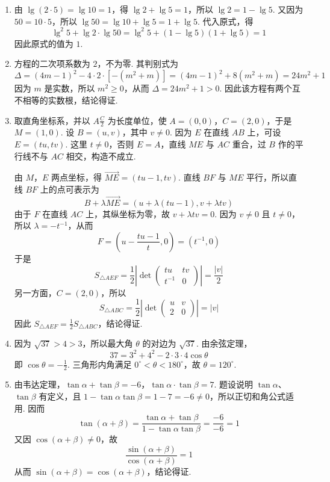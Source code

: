 \begin{solution}
\begin{enumerate}
\item 由 \(\lg\left(2\cdot5\right)=\lg10=1\)，得 \(\lg2+\lg5=1\)，所以 \(\lg2=1-\lg5\). 又因为 \(50=10\cdot5\)，所以 \(\lg50=\lg10+\lg5=1+\lg5\). 代入原式，得
\[
\lg^{2}5+\lg2\cdot\lg50=\lg^{2}5+\left(1-\lg5\right)\left(1+\lg5\right)=1
\]
因此原式的值为 \(1\).

\item 方程的二次项系数为 \(2\)，不为零. 其判别式为
\[
\Delta=\left(4m-1\right)^{2}-4\cdot2\cdot\left[-\left(m^{2}+m\right)\right]=\left(4m-1\right)^{2}+8\left(m^{2}+m\right)=24m^{2}+1
\]
因为 \(m\) 是实数，所以 \(m^{2}\geq0\)，从而 \(\Delta=24m^{2}+1>0\). 因此该方程有两个互不相等的实数根，结论得证.

\item 取直角坐标系，并以 \(A\frac{C}{2}\) 为长度单位，使 \(A=(0,0)\)，\(C=(2,0)\)，于是 \(M=(1,0)\). 设 \(B=(u,v)\)，其中 \(v\ne0\). 因为 \(E\) 在直线 \(AB\) 上，可设 \(E=(tu,tv)\). 这里 \(t\ne0\)，否则 \(E=A\)，直线 \(ME\) 与 \(AC\) 重合，过 \(B\) 作的平行线不与 \(AC\) 相交，构造不成立.

由 \(M\)，\(E\) 两点坐标，得 \(\overrightarrow{ME}=(tu-1,tv)\). 直线 \(BF\) 与 \(ME\) 平行，所以直线 \(BF\) 上的点可表示为
\[
B+\lambda\overrightarrow{ME}=\left(u+\lambda\left(tu-1\right),v+\lambda tv\right)
\]
由于 \(F\) 在直线 \(AC\) 上，其纵坐标为零，故 \(v+\lambda tv=0\). 因为 \(v\ne0\) 且 \(t\ne0\)，所以 \(\lambda=-t^{-1}\)，从而
\[
F=\left(u-\frac{tu-1}{t},0\right)=\left(t^{-1},0\right)
\]
于是
\[
S_{\triangle AEF}=\frac{1}{2}\left|\det\begin{pmatrix}tu&tv\\ t^{-1}&0\end{pmatrix}\right|=\frac{|v|}{2}
\]
另一方面，\(C=(2,0)\)，所以
\[
S_{\triangle ABC}=\frac{1}{2}\left|\det\begin{pmatrix}u&v\\ 2&0\end{pmatrix}\right|=|v|
\]
因此 \(S_{\triangle AEF}=\frac{1}{2}S_{\triangle ABC}\)，结论得证.

\item 因为 \(\sqrt{37}>4>3\)，所以最大角 \(\theta\) 的对边为 \(\sqrt{37}\). 由余弦定理，
\[
37=3^{2}+4^{2}-2\cdot3\cdot4\cos\theta
\]
即 \(\cos\theta=-\frac{1}{2}\). 三角形内角满足 \(0^{\circ}<\theta<180^{\circ}\)，故 \(\theta=120^{\circ}\).

\item 由韦达定理，\(\tan\alpha+\tan\beta=-6\)，\(\tan\alpha\cdot\tan\beta=7\). 题设说明 \(\tan\alpha\)、\(\tan\beta\) 有定义，且 \(1-\tan\alpha\tan\beta=1-7=-6\ne0\)，所以正切和角公式适用. 因而
\[
\tan\left(\alpha+\beta\right)=\frac{\tan\alpha+\tan\beta}{1-\tan\alpha\tan\beta}=\frac{-6}{-6}=1
\]
又因 \(\cos\left(\alpha+\beta\right)\ne0\)，故
\[
\frac{\sin\left(\alpha+\beta\right)}{\cos\left(\alpha+\beta\right)}=1
\]
从而 \(\sin\left(\alpha+\beta\right)=\cos\left(\alpha+\beta\right)\)，结论得证.
\end{enumerate}
\end{solution}

